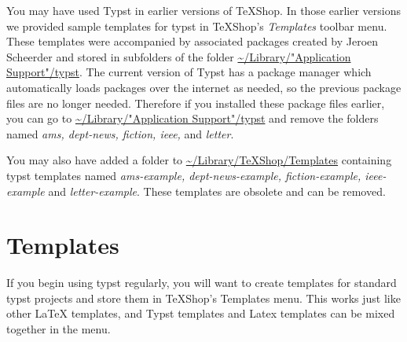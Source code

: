 \documentclass[11pt, oneside]{article}   	%
\begin{document}
You may have used Typst in earlier versions of TeXShop. In those earlier versions we provided sample  templates for typst in TeXShop's {\em Templates} toolbar menu. These templates were accompanied by associated packages created by 
Jeroen Scheerder and stored in subfolders of the folder \url{~/Library/"Application Support"/typst}. 
The current version of Typst has a package manager which automatically loads packages over the internet as needed,
so the previous package files are no longer needed. Therefore if you installed these package files earlier, you can go to \url{~/Library/"Application Support"/typst} and remove the folders named {\em ams, dept-news, fiction, ieee,} and {\em letter}. 

You may also have added a folder  to \url{~/Library/TeXShop/Templates} containing typst  templates named {\em ams-example, dept-news-example, fiction-example, ieee-example} and {\em letter-example}.
These templates are obsolete and can be removed.

\section{Templates}

If you begin using typst regularly, you will want to create templates for standard typst projects
and store them in TeXShop's Templates menu. This works just like other LaTeX templates, and 
Typst templates and Latex templates can be mixed together in the menu. 


%
\end{document}
